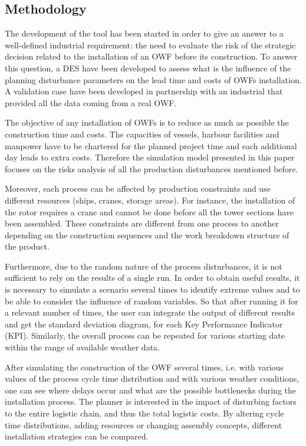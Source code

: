 \subsection{Methodology}
The development of the tool has been started in order to give an answer to a well-defined industrial requirement: the need to evaluate the risk of the strategic decision related to the installation of an OWF before its construction. To answer this question, a DES have been developed to assess what is the influence of the planning disturbance parameters on the lead time and costs of OWFs installation. A validation case have been developed in partnership with an industrial that provided all the data coming from a real OWF.

The objective of any installation of OWFs is to reduce as much as possible the construction time and costs. The capacities of vessels, harbour facilities and manpower have to be chartered for the planned project time and each additional day leads to extra costs. Therefore the simulation model presented in this paper focuses on the risks analysis of all the production disturbances mentioned before.



Moreover, each process can be affected by production constraints and use different resources (ships, cranes, storage areas). For instance, the installation of the rotor requires a crane and cannot be done before all the tower sections have been assembled. These constraints are different from one process to another depending on the construction sequences and the work breakdown structure of the product.



Furthermore, due to the random nature of the process disturbances, it is not sufficient to rely on the results of a single run. In order to obtain useful results, it is necessary to simulate a scenario several times to identify extreme values and to be able to consider the influence of random variables. So that after running it for a relevant number of times, the user can integrate the output of different results and get the standard deviation diagram, for each Key Performance Indicator (KPI). Similarly, the overall process can be repeated for various starting date within the range of available weather data.

After simulating the construction of the OWF several times, i.e. with various values of the process cycle time distribution and with various weather conditions, one can see where delays occur and what are the possible bottlenecks during the installation process. The planner is interested in the impact of disturbing factors to the entire logistic chain, and thus the total logistic costs. By altering cycle time distributions, adding resources or changing assembly concepts, different installation strategies can be compared.
